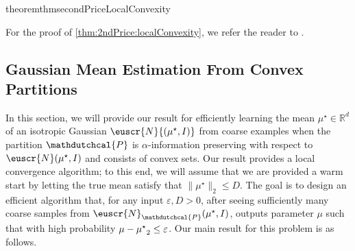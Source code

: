 \documentclass[11pt,letterpaper]{article}
\theoremstyle{plain}
\theoremstyle{definition}
\theoremstyle{remark}
\newcommand{\inparen}[1]{\ensuremath{\left(#1\right)}}
\let\norm\relax
\newcommand{\norm}[1]{\ensuremath{\left\lVert #1 \right\rVert}}
\newcommand{\R}{\mathbb{R}}
\newcommand{\eps}{\varepsilon}
\newcommand{\customcal}[1]{\euscr{#1}}
\newcommand{\cN}{\customcal{N}}
\newcommand{\hypo}[1]{\mathdutchcal{#1}}
\newcommand{\hyP}{\hypo{P}}
\newcommand{\normal}[2]{\cN{\inparen{#1,#2}}}
\newcommand{\muStar}{{\mu^\star}}
\begin{document}
{\begin{restatable}{theorem}{thmsecondPriceLocalConvexity}
    \end{restatable}  
    For the proof of \cref{thm:2ndPrice:localConvexity}, we refer the reader to .

    \subsection{Gaussian Mean Estimation From Convex Partitions}
    \label{sec:coarseConvex}
    In this section, we will provide our result for efficiently learning the mean $\mu^\star \in \R^d$ of an isotropic Gaussian  $\normal{\mu^\star}{I}$ from coarse examples when the partition $\hyP$ is $\alpha$-information preserving with respect to $\cN(\mu^\star, I)$ and consists of convex sets.  
    Our result provides a local convergence algorithm; to this end, we will assume that we are provided a warm start by letting the true mean satisfy that $\| \mu^\star \|_2 \leq D.$
    The goal is to design an efficient algorithm that, 
    for any input $\eps, D > 0$, 
    after seeing sufficiently many coarse samples from $\cN_{\hyP}(\mu^\star, I)$, outputs parameter $\mu$ such that with high probability 
$\norm{\mu-\muStar}_{2} \leq \eps$.
     Our main result for this problem is as follows.
    
}
\end{document}

